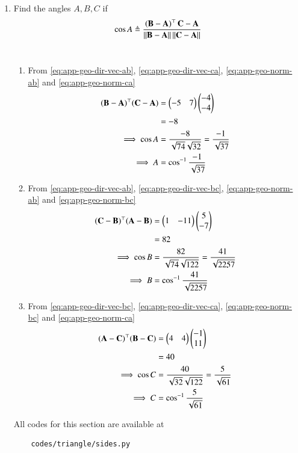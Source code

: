 \begin{enumerate}[label=\thesubsection.\arabic*.,ref=\thesubsection.\theenumi]
%  		
	\item Find the angles $A, B, C$ if 
  \begin{align}
    \label{eq:app-angle2d}
			\cos A \triangleq 
\frac{\left(\mathbf{B}-\mathbf{A}\right)^{\top}{\mathbf{C}-\mathbf{A}}}{\left\lVert\mathbf{B}-\mathbf{A}\right\rVert\left\lVert\mathbf{C}-\mathbf{A}\right\rVert}
  \end{align}\\
  \solution
\begin{enumerate}
	\item From 
		\eqref{eq:app-geo-dir-vec-ab},
		\eqref{eq:app-geo-dir-vec-ca},
		\eqref{eq:app-geo-norm-ab}
		and
		\eqref{eq:app-geo-norm-ca}
\begin{align}
	(\mathbf{B}-\mathbf{A})^{\top}(\mathbf{C}-\mathbf{A})&=\begin{pmatrix}-5&7\end{pmatrix}\begin{pmatrix}-4\\-4\end{pmatrix}\\
	&=-8
	\\
	\implies
	\cos{A}&= \frac{-8}{\sqrt{74} \sqrt{32}}
	= \frac{-1}{\sqrt{37}}\\
	\implies A&=\cos^{-1}{\frac{-1}{\sqrt{37}}}
\end{align}
	\item From 
		\eqref{eq:app-geo-dir-vec-ab},
		\eqref{eq:app-geo-dir-vec-bc},
		\eqref{eq:app-geo-norm-ab}
		and
		\eqref{eq:app-geo-norm-bc}
\begin{align}
	(\mathbf{C}-\mathbf{B})^{\top}(\mathbf{A}-\mathbf{B})&=\begin{pmatrix}1&-11\end{pmatrix}\begin{pmatrix}5\\-7\end{pmatrix}\\
	&= 82
	\\
	\implies
	\cos{B}&= \frac{82}{\sqrt{74} \sqrt{122}}
	= \frac{41}{\sqrt{2257}}\\
	\implies B&=\cos^{-1}{\frac{41}{\sqrt{2257}}}
\end{align}
	\item From 
		\eqref{eq:app-geo-dir-vec-bc},
		\eqref{eq:app-geo-dir-vec-ca},
		\eqref{eq:app-geo-norm-bc}
		and
		\eqref{eq:app-geo-norm-ca}
\begin{align}
	(\mathbf{A}-\mathbf{C})^{\top}(\mathbf{B}-\mathbf{C})&=\begin{pmatrix}4&4\end{pmatrix}\begin{pmatrix}-1\\11\end{pmatrix}\\
	&=40
	\\
\implies	\cos{C}&= \frac{40}{\sqrt{32} \sqrt{122}}
	= \frac{5}{\sqrt{61}}\\
	\implies C&=\cos^{-1}{\frac{5}{\sqrt{61}}}
\end{align}

\end{enumerate}
%  	
All codes for this section are available at
\begin{lstlisting}
	codes/triangle/sides.py
\end{lstlisting}
\end{enumerate}
